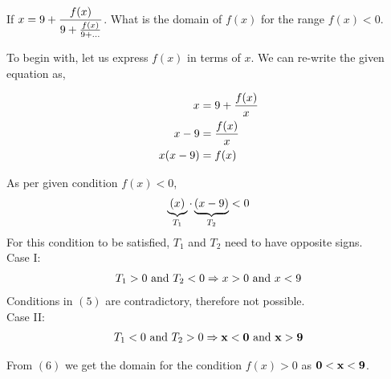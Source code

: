 

\question If $x = 9 + \dfrac{f(x)}{9 + \frac{f(x)}{9 + ...}}$. What
is the domain of $f(x)$ for the range $f(x) < 0$.

\watchout

\begin{solution}
  To begin with, let us express $f(x)$ in terms of $x$. We can re-write
  the given equation as,
  
  \begin{align}
    x        &= 9 + \dfrac{f(x)}{x} \\
    x-9    &= \dfrac{f(x)}{x} \\
    x(x-9) &= f(x)
  \end{align}
  
  As per given condition $f(x) < 0 $,
  \begin{align}
    \underbrace{(x)}_{T_1} \cdot \underbrace{(x-9)}_{T_2} < 0    
  \end{align}
  For this condition to be satisfied, $T_1$ and $T_2$ need to have
  opposite signs.\\
  
  Case I: 
  \begin{align}
    T_1 > 0 \text{ and } T_2 < 0 \Rightarrow x > 0 \text{ and } x < 9
  \end{align}
  Conditions in $(5)$ are contradictory, therefore not possible.\\
  
  Case II:
  \begin{align}
    T_1 < 0 \text{ and } T_2 > 0 \Rightarrow \mathbf{x < 0 \text{ and } x > 9}
  \end{align}
  
  From $(6)$ we get the domain for the condition $f(x)>0$ as
  $\mathbf{0 < x < 9}$.
  
\end{solution}

